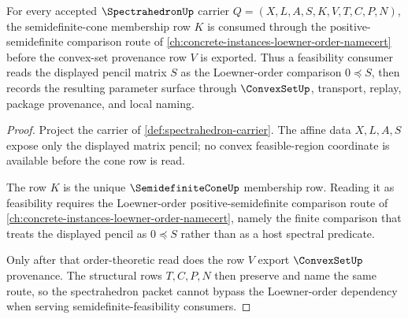 \begin{theorem}
\label{thm:spectrahedron-loewner-order-handoff}
For every accepted $\SpectrahedronUp$ carrier $Q=(X,L,A,S,K,V,T,C,P,N)$, the semidefinite-cone membership row $K$ is consumed through the positive-semidefinite comparison route of \autoref{ch:concrete-instances-loewner-order-namecert} before the convex-set provenance row $V$ is exported. Thus a feasibility consumer reads the displayed pencil matrix $S$ as the Loewner-order comparison $0 \preceq S$, then records the resulting parameter surface through $\ConvexSetUp$, transport, replay, package provenance, and local naming.
\end{theorem}
\begin{proof}
Project the carrier of \autoref{def:spectrahedron-carrier}. The affine data $X,L,A,S$ expose only the displayed matrix pencil; no convex feasible-region coordinate is available before the cone row is read.

The row $K$ is the unique $\SemidefiniteConeUp$ membership row. Reading it as feasibility requires the Loewner-order positive-semidefinite comparison route of \autoref{ch:concrete-instances-loewner-order-namecert}, namely the finite comparison that treats the displayed pencil as $0 \preceq S$ rather than as a host spectral predicate.

Only after that order-theoretic read does the row $V$ export $\ConvexSetUp$ provenance. The structural rows $T,C,P,N$ then preserve and name the same route, so the spectrahedron packet cannot bypass the Loewner-order dependency when serving semidefinite-feasibility consumers.
\end{proof}


